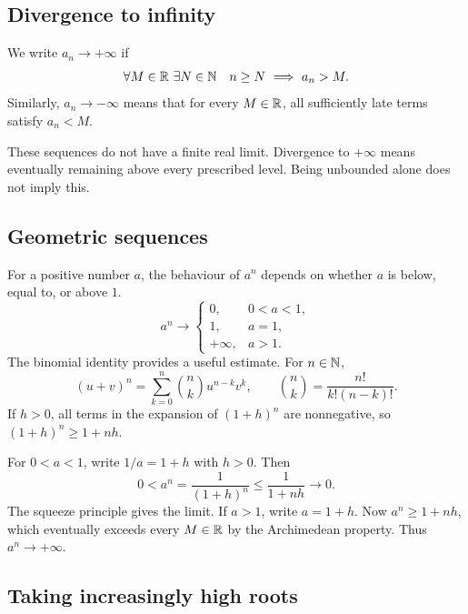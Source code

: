 \subsection{Divergence to infinity}

\begin{definition}
  We write $a_n\to+\infty$ if
  \[
    \forall M\in\mathbb{R}\ \exists N\in\mathbb{N}\quad n\ge N\ \Longrightarrow\ a_n>M.
  \]
  Similarly, $a_n\to-\infty$ means that for every $M\in\mathbb{R}$, all
  sufficiently late terms satisfy $a_n<M$.
\end{definition}

These sequences do not have a finite real limit. Divergence to
$+\infty$ means eventually remaining above every prescribed level.
Being unbounded alone does not imply this.

\subsection{Geometric sequences}

For a positive number $a$, the behaviour of $a^n$ depends on whether
$a$ is below, equal to, or above $1$.
\[
  a^n\longrightarrow
  \begin{cases}
    0,&0<a<1,\\
    1,&a=1,\\
    +\infty,&a>1.
  \end{cases}
\]
The binomial identity provides a useful estimate. For $n\in\mathbb{N}$,
\[
  (u+v)^n=\sum_{k=0}^n\binom nk u^{n-k}v^k,
  \qquad \binom nk=\frac{n!}{k!(n-k)!}.
\]
If $h>0$, all terms in the expansion of $(1+h)^n$ are nonnegative,
so $(1+h)^n\ge1+nh$.


For $0<a<1$, write $1/a=1+h$ with $h>0$. Then
\[
  0<a^n=\frac{1}{(1+h)^n}\le\frac{1}{1+nh}\longrightarrow0.
\]
The squeeze principle gives the limit. If $a>1$, write $a=1+h$.
Now $a^n\ge1+nh$, which eventually exceeds every $M\in\mathbb{R}$ by the
Archimedean property. Thus $a^n\to+\infty$.

\subsection{Taking increasingly high roots}

